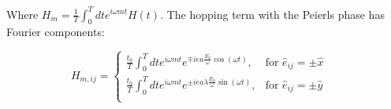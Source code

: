 Where $H_m = \frac{1}{T}\int_0^T dt e^{i\omega mt} H(t)$. The hopping term with the Peierls phase has Fourier components:

\begin{equation}
H_{m,ij} = \begin{cases}
	\frac{t_0}{T} \int_0^T dt e^{i\omega mt} e^{\mp iea\frac{E_0}{\omega}\cos(\omega t)}, & \text{for } \hat{e}_{ij} = \pm \hat{x} \\
	\frac{t_0}{T} \int_0^T dt e^{i\omega mt} e^{\pm iea\lambda\frac{E_0}{\omega}\sin(\omega t)}, & \text{for } \hat{e}_{ij} = \pm \hat{y} \\
\end{cases} \quad
\end{equation}

